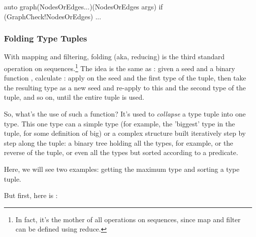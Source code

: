 \begin{dcode}
auto graph(NodesOrEdges...)(NodesOrEdges args) if (GraphCheck!NodesOrEdges)
{ ... }
\end{dcode}


\subsubsection{Folding Type Tuples}\label{staticreduce}

With mapping and filtering, folding (aka, reducing) is the third standard operation on sequences.\footnote{ In fact, it's the mother of all operations on sequences, since map and filter can be defined using reduce.} The idea is the same as : given a seed  and a binary function , calculate : apply  on the seed and the first type of the tuple, then take the resulting type as a new seed and re-apply  to this and the second type of the tuple, and so on, until the entire tuple is used.

So, what's the use of such a function? It's used to \emph{collapse} a type tuple into one type. This one type can a simple type (for example, the 'biggest' type in the tuple, for some definition of big) or a complex structure built iteratively step by step along the tuple: a binary tree holding all the types, for example, or the reverse of the tuple, or even all the types but sorted according to a predicate.

Here, we will see two examples: getting the maximum type and sorting a type tuple.

But first, here is :


